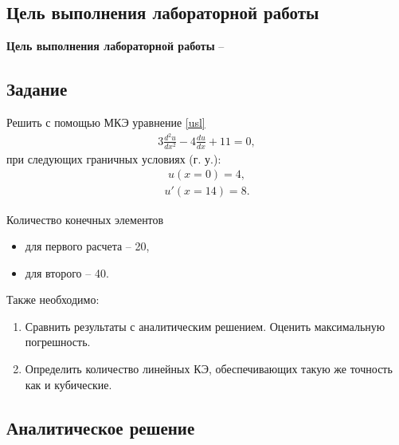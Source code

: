 \subsection{Цель выполнения лабораторной работы}\label{blockN.VariantM}
\textbf{Цель выполнения лабораторной работы }-- \GoalOfResearch

\subsection{Задание}

Решить с помощью МКЭ уравнение \ref{usl}
\begin{align}\label{usl}
3\frac{d^2u}{dx^2}
 -4 \frac{du}{dx}  
 + 11 
=0,
\end{align}
при следующих граничных условиях (г. у.): 
\begin{align}\label{2_rod}
    u(x=0) = 4,
\end{align}
\begin{align}\label{1_rod}
    u'(x=14) = 8.
\end{align}

Количество конечных элементов
\begin{itemize}
    \item для первого расчета -- 20,
    \item для второго -- 40.
\end{itemize}

Также необходимо:
\begin{enumerate}
    \item Сравнить результаты с аналитическим решением. Оценить максимальную погрешность.
    \item Определить количество линейных КЭ, обеспечивающих такую же точность как и кубические.
\end{enumerate}

\newpage
\subsection{Аналитическое решение}

